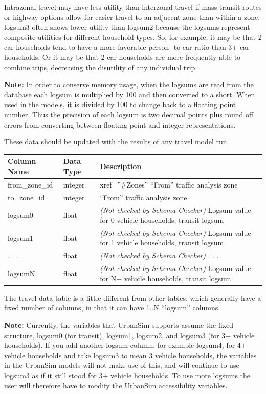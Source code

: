 Intrazonal travel may have less utility than interzonal travel if
mass transit routes or highway options allow for easier travel to an
adjacent zone than within a zone. logsum3 often shows lower utility
than logsum2 because the logsums represent composite utilities for
different household types. So, for example, it may be that 2 car
households tend to have a more favorable person- to-car ratio than
3+ car households. Or it may be that 2 car households are more
frequently able to combine trips, decreasing the disutility of any
individual trip.


\textbf{Note:}
In order to conserve memory usage, when the logsums are read from the database
each logsum is multiplied by 100 and then converted to a short. When used in
the models, \modelsindex it is divided by 100 to change back to a floating point number.
Thus the precision of each logsum is two decimal points plus round off errors
from converting between floating point and integer representations.


These data should be updated with the results of any travel model \modelsindex run.


\begin{tabular}{|l|l|p{4in}|}
\hline
\textbf{Column Name} & \textbf{Data Type} & \textbf{Description} \\
\hline
from_zone_id & integer &  xref=''\#Zones'' ``From'' traffic analysis zone   \\
\hline
to_zone_id & integer &  ``From'' traffic analysis zone   \\
\hline
logsum0 & float & \emph{(Not checked by Schema Checker) }
Logsum value for 0 vehicle households, transit logsum  \\
\hline
logsum1 & float & \emph{(Not checked by Schema Checker) }
Logsum value for 1 vehicle households, transit logsum  \\
\hline
. . . & float & \emph{(Not checked by Schema Checker) }
. . .  \\
\hline
logsumN & float & \emph{(Not checked by Schema Checker) }
Logsum value for N+ vehicle households, transit logsum  \\
\hline

\end{tabular}



The travel data table is a little different from other tables, which generally
have a fixed number of columns, in that it can have 1..N ``logsum'' columns.

\textbf{Note:} Currently, the variables that UrbanSim supports assume the
fixed structure, logsum0 (for transit), logsum1, logsum2, and logsum3 (for
3+ vehicle households). If you add another logsum column, for example
logsum4, for 4+ vehicle households and take logsum3 to mean 3 vehicle
households, the variables in the UrbanSim models will not make
use of this, and will continue to use logsum3 as if it still stood for 3+
vehicle households. To use more logsums the user will therefore have to
modify the UrbanSim accessibility variables.

